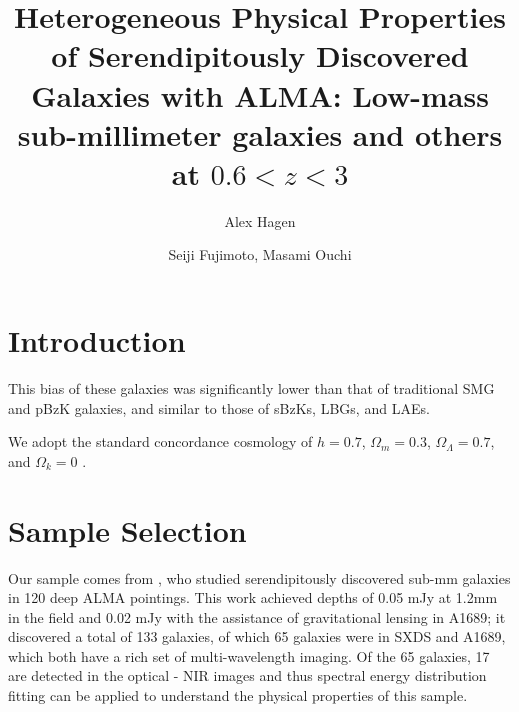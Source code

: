 \documentclass[preprint,natbib209]{aastex}
\begin{document}
\title{Heterogeneous Physical Properties of Serendipitously Discovered Galaxies with ALMA: 
Low-mass sub-millimeter galaxies and others at $0.6 < z < 3$}

\author{Alex Hagen}

\author{Seiji Fujimoto, Masami Ouchi}


\begin{abstract} 

\end{abstract}


\section{Introduction}
\label{sec:intro}

This bias of these galaxies was significantly lower than that of traditional SMG and pBzK galaxies, 
and similar to those of sBzKs, LBGs, and LAEs. 

We adopt the standard concordance cosmology of $h = 0.7$, $\Omega_m = 0.3$, $\Omega_\Lambda = 0.7$, 
and $\Omega_k = 0$ \citep{planck13}.

\section{Sample Selection} 
\label{sec:sample}

Our sample comes from \cite{fujimoto15}, who studied serendipitously discovered sub-mm galaxies in 
120 deep ALMA pointings. This work achieved depths of 0.05 mJy at 1.2mm in the field and 0.02 mJy 
with the assistance of gravitational lensing in A1689; it discovered a total of 133 galaxies, of which 65 galaxies 
were in SXDS and A1689, which both have a rich set of multi-wavelength imaging. Of the 65 galaxies, 
17 are detected in the optical - NIR images and thus spectral energy distribution fitting can be applied to 
understand the physical properties of this sample.
\end{document}
